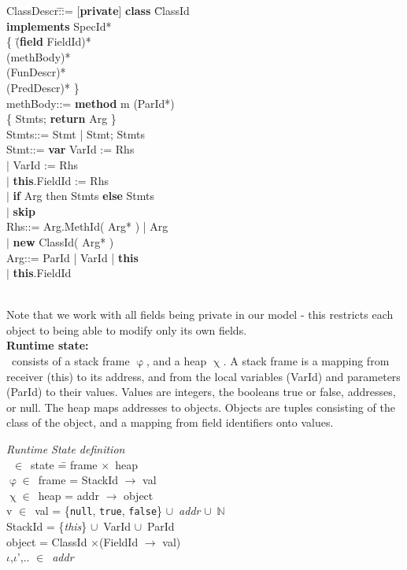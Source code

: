 \documentclass[a4paper,11pt,twoside]{article}
\newenvironment{logic}
{\begin{minipage}[c]{\linewidth}  \sffamily \mdseries \begin{tabbing}}
{\end{tabbing}\end{minipage}\vspace{0.3em}}
\newcommand{\loin}{$\in$}
\newcommand{\losigma}{\text{$\upsigma$}}
\newcommand{\lochi}{$\upchi$}
\newcommand{\lophi}{$\upvarphi$}
\newcommand{\locup} {$\cup$}
\newcommand{\lotimes} {$\times$}
\begin{document}
\begin{logic}
ClassDescr\quad\=:\=:= [\textbf{private}] \textbf{class} \=ClassId\\
\>\>\>\textbf{implements} SpecId*\\
\>\>\{ \=(\textbf{field} FieldId)*\\
\>\>\> (methBody)*\\
\>\>\> (FunDescr)*\\
\>\>\> (PredDescr)* \}\\
methBody\>::= \textbf{method} m (ParId*)\\
\>\>\{ Stmts; \textbf{return} Arg \}\\
Stmts\>::= Stmt | Stmt; Stmts\\
Stmt\>::= \textbf{var} VarId := Rhs\\
\>\>$|$ VarId := Rhs\\
\>\>$|$ \textbf{this}.FieldId := Rhs\\
\>\>$|$ \textbf{if} Arg then Stmts \textbf{else} Stmts\\
\>\>$|$ \textbf{skip}\\
Rhs\>::= Arg.MethId( Arg* ) | Arg\\
\>\>$|$ \textbf{new} ClassId( Arg* )\\
Arg\>::= ParId | VarId | \textbf{this}\\
\>\>$|$ \textbf{this}.FieldId\\
\end{logic}\\
Note that we work with all fields being private in our model - this restricts each object to being able to modify only its own fields.\\

\textbf{Runtime state:}\\
\losigma\ consists of a stack frame \lophi, and a heap \lochi. A stack frame is a mapping from receiver (this) to its address, and from the local variables (VarId) and parameters (ParId) to their values. Values are integers, the booleans true or false, addresses, or null. The heap maps addresses to objects. Objects are tuples consisting of the class of the object, and a mapping from field identifiers onto values.\\

\begin{logic}
\textit{Runtime State definition}\\
\losigma\ \loin\ state \quad\= = frame \lotimes\ heap \\
\lophi \loin\ frame \>= StackId $\rightarrow$ val \\
\lochi \loin\ heap \>= addr $\rightarrow$ object \\
v \loin\ val \>= \{\texttt{null}, \texttt{true}, \texttt{false}\} \locup\ \textit{addr} \locup\ $\mathbb{N}$ \\
StackId \>= \{\textit{this}\} \locup\ VarId \locup\ ParId \\
object \>= ClassId \lotimes (FieldId $\rightarrow$ val)\\
$\iota$,$\iota$',.. \>\loin\ \textit{addr}\\
\end{logic}
\end{document}
